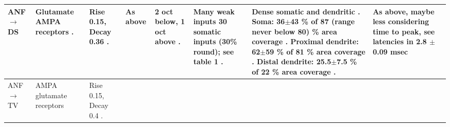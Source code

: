 \begin{longtable}{XXXXXXXX}
\\ \midrule
ANF\ensuremath{\rightarrow}DS                   
& %
Glutamate  AMPA receptors \citep{FerragamoGoldingEtAl:1998a,WentholdHunterEtAl:1993}.
& %
Rise 0.15, Decay 0.36 \citep{GardnerTrussellEtAl:1999,Oertel:1983}.  
& %
As above
& %
2 oct below, 1 oct above \citep{PalmerJiangEtAl:1996}. 
& %
Many weak inputs \citep{FerragamoGoldingEtAl:1998a} 
30 somatic inputs (30\% round); see table 1 \citep{SmithRhode:1989}.
& %
Dense somatic and dendritic \citep{Cant:1981,Cant:1982,RyugoWrightEtAl:1993}.
Soma: 36$\pm$43 \%  of 87 (range never below 80) \% area coverage   \citep[cat][]{SmithRhode:1989}. 
Proximal dendrite: 62$\pm$59 \%  of 81 \% area coverage   \citep[cat][]{SmithRhode:1989}. 
Distal dendrite: 25.5$\pm$7.5 \%  of 22 \% area coverage   \citep[cat][]{SmithRhode:1989}. 
& %
As above, maybe less considering time to peak,
see latencies in \citep{PaoliniClark:1999} 
2.8 $\pm$0.09 msec \citep[Oc latency]{RhodeSmith:1986} 
\\ \midrule

ANF \ensuremath{\rightarrow}TV                       
& %
AMPA glutamate receptors \citep{ZhangOertel:1993}                          
& %
Rise 0.15, Decay 0.4 \citep{GardnerTrussellEtAl:1999}.

& %
& %


\end{longtable}
